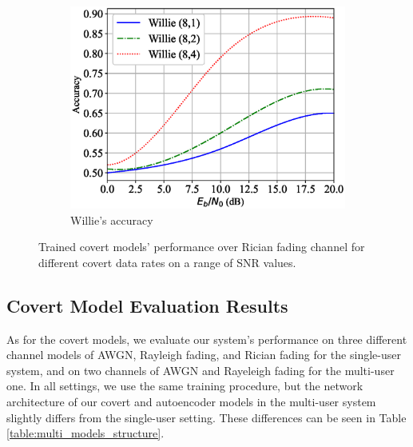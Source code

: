 \begin{figure}[tp!]
\begin{subfigure}{0.3\textwidth}
		\includegraphics[width=\linewidth]{figs/willie_accuracy_rician}
		\caption{Willie's accuracy}
		\label{fig:rician_resutls_willie}
	\end{subfigure}
	\caption{Trained covert models' performance over Rician fading channel for different covert data rates on a range of SNR values.}
	\label{fig:rician_resutls}
\end{figure}


\subsection{Covert Model Evaluation Results}
As for the covert models, we evaluate our system's performance on three different channel models of AWGN, Rayleigh fading, and Rician fading for the single-user system, and on two channels of AWGN and Rayeleigh fading for the multi-user one. In all settings, we use the same training procedure, but the network architecture of our covert and autoencoder models in the multi-user system slightly differs from the single-user setting. These differences can be seen in Table \ref{table:multi_models_structure}.

